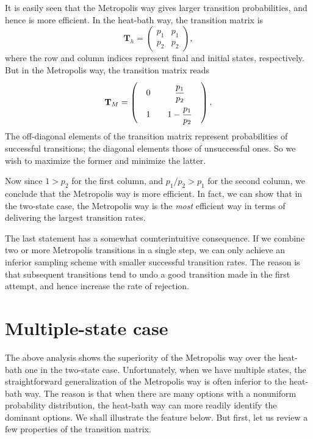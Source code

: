 \documentclass[12pt]{article}
\begin{document}
It is easily seen that
the Metropolis way gives larger transition probabilities,
and hence is more efficient.
%
In the heat-bath way, the transition matrix is
$$
\mathbf T_h =
\left(
  \begin{array}{ccc}
    p_1 & p_1 \\
    p_2 & p_2
  \end{array}
\right),
$$
where the row and column indices represent final and initial states,
respectively.
But in the Metropolis way, the transition matrix reads
$$
\mathbf T_M =
\left(
  \arraycolsep=10.0pt\def\arraystretch{2.0}
  \begin{array}{ccc}
    0 & \dfrac{ p_1 }{ p_2 }  \\
    1 & 1 - \dfrac{ p_1 }{ p_2 }
  \end{array}
\right).
$$
%
The off-diagonal elements of the transition matrix represent
probabilities of successful transitions;
the diagonal elements those of unsuccessful ones.
%
So we wish to maximize the former and minimize the latter.


Now since $1 > p_2$ for the first column,
and $p_1/p_2 > p_1$ for the second column,
we conclude that the Metropolis way is more efficient.
%
In fact, we can show that in the two-state case,
the Metropolis way is the \emph{most} efficient way
in terms of delivering the largest transition rates.

The last statement has a somewhat counterintuitive consequence.
If we combine two or more Metropolis transitions
in a single step, we can only achieve an inferior
sampling scheme with smaller successful transition rates.
The reason is that subsequent transitions tend to
undo a good transition made in the first attempt,
and hence increase the rate of rejection.




\section{Multiple-state case}

The above analysis shows the superiority of the Metropolis way
over the heat-bath one in the two-state case.
%
Unfortunately, when we have multiple states,
the straightforward generalization of the Metropolis way
is often inferior to the heat-bath way.
%
The reason is that when there are many options with
a nonuniform probability distribution,
the heat-bath way can more readily identify the dominant options.
%
We shall illustrate the feature below.
%
But first, let us review a few properties of the transition matrix.
\end{document}
